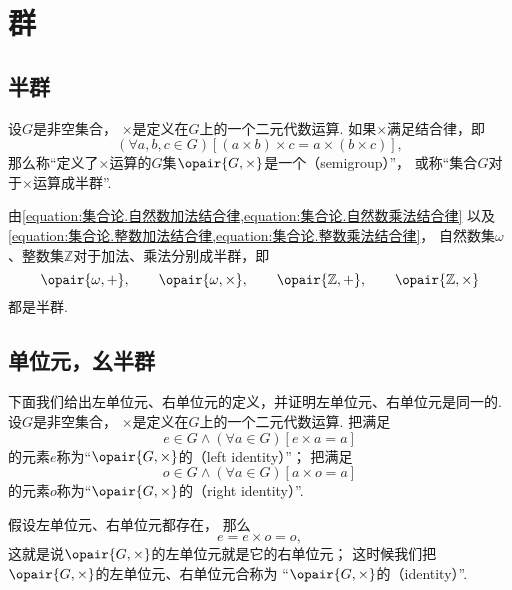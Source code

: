 \section{群}
\subsection{半群}
\begin{definition}\label{definition:抽象代数.半群的定义}
设\(G\)是非空集合，
\(\times\)是定义在\(G\)上的一个二元代数运算.
如果\(\times\)满足结合律，即\begin{equation*}
	(\forall a,b,c \in G)
	[(a \times b) \times c = a \times (b \times c)],
\end{equation*}
那么称“定义了\(\times\)运算的\(G\)集\(\opair{G,\times}\)是一个（semigroup）”，
或称“集合\(G\)对于\(\times\)运算成半群”.
\end{definition}

由\cref{equation:集合论.自然数加法结合律,equation:集合论.自然数乘法结合律}
以及\cref{equation:集合论.整数加法结合律,equation:集合论.整数乘法结合律}，
自然数集\(\omega\)、整数集\(\mathbb{Z}\)对于加法、乘法分别成半群，即\begin{equation*}
	\opair{\omega,+}, \qquad
	\opair{\omega,\times}, \qquad
	\opair{\mathbb{Z},+}, \qquad
	\opair{\mathbb{Z},\times}
\end{equation*}都是半群.

\subsection{单位元，幺半群}
下面我们给出左单位元、右单位元的定义，并证明左单位元、右单位元是同一的.
设\(G\)是非空集合，
\(\times\)是定义在\(G\)上的一个二元代数运算.
把满足\begin{equation*}
	e \in G
	\land
	(\forall a \in G)[e \times a = a]
\end{equation*}的元素\(e\)称为“\(\opair{G,\times}\)的（left identity）”；
把满足\begin{equation*}
	o \in G
	\land
	(\forall a \in G)[a \times o = a]
\end{equation*}的元素\(o\)称为“\(\opair{G,\times}\)的（right identity）”.

假设左单位元、右单位元都存在，
那么\begin{equation*}
	e = e \times o = o,
\end{equation*}
这就是说\(\opair{G,\times}\)的左单位元就是它的右单位元；
这时候我们把\(\opair{G,\times}\)的左单位元、右单位元合称为%
“\(\opair{G,\times}\)的（identity）”.

